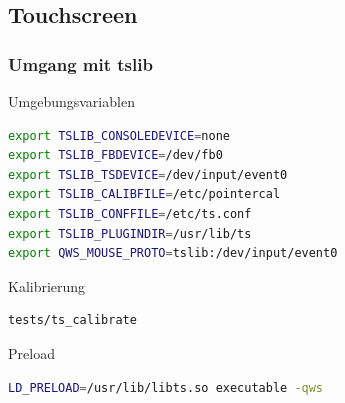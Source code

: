 \documentclass{beamer}
\begin{document}
  \subsection{Touchscreen}
	\begin{frame}
    \frametitle{Umgang mit tslib}
    \begin{block}{Umgebungsvariablen}
      \begin{lstlisting}[language=Bash]
export TSLIB_CONSOLEDEVICE=none
export TSLIB_FBDEVICE=/dev/fb0
export TSLIB_TSDEVICE=/dev/input/event0
export TSLIB_CALIBFILE=/etc/pointercal
export TSLIB_CONFFILE=/etc/ts.conf
export TSLIB_PLUGINDIR=/usr/lib/ts
export QWS_MOUSE_PROTO=tslib:/dev/input/event0
      \end{lstlisting}
    \end{block}
    \begin{block}{Kalibrierung}
      \begin{lstlisting}[language=Bash]
        tests/ts_calibrate
      \end{lstlisting}
    \end{block}
    \begin{block}{Preload}
      \begin{lstlisting}[language=Bash]
LD_PRELOAD=/usr/lib/libts.so executable -qws
      \end{lstlisting}
    \end{block}
  \end{frame}
\end{document}
